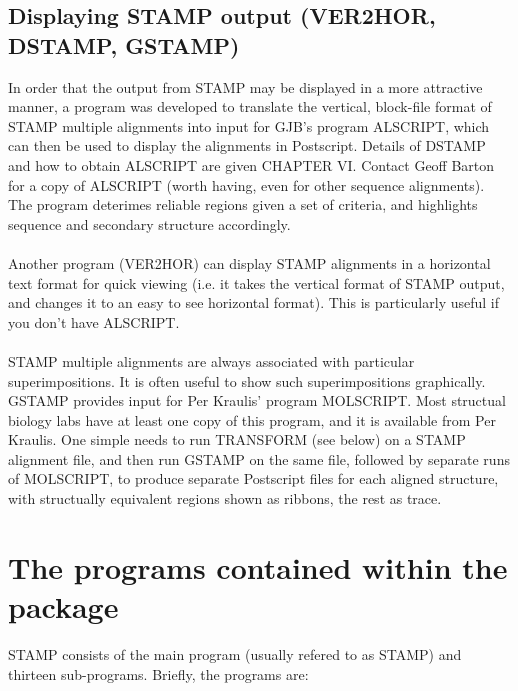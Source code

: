 \subsection{Displaying STAMP output (VER2HOR, DSTAMP, GSTAMP)}

In order that the output from STAMP may be displayed in a more 
attractive manner, a program was developed to translate the
vertical, block-file format of STAMP multiple alignments into input
for GJB's program ALSCRIPT, which can then be used to display the
alignments in Postscript.  Details of DSTAMP and how to obtain
ALSCRIPT are given CHAPTER VI.  Contact Geoff Barton for a copy of
ALSCRIPT (worth having, even for other sequence alignments).
The program deterimes reliable regions given a set of criteria, and
highlights sequence and secondary structure accordingly.\\
\\
Another program (VER2HOR) can display STAMP alignments in a horizontal text
format for quick viewing (i.e. it takes the vertical format of STAMP output, and
changes it to an easy to see horizontal format).
This is particularly useful if you don't have ALSCRIPT.\\
\\
STAMP multiple alignments are always associated with particular
superimpositions.  It is often useful to show such superimpositions
graphically.  GSTAMP provides input for Per
Kraulis' program MOLSCRIPT.  Most structual biology labs have at
least one copy of this program, and it is available from Per
Kraulis.  One simple needs to run TRANSFORM (see below) on a STAMP
alignment file, and then run GSTAMP on the same file, followed by
separate runs of MOLSCRIPT, to produce separate Postscript files
for each aligned structure, with structually equivalent regions
shown as ribbons, the rest as \Cal trace.

\section{The programs contained within the package}

STAMP consists of the main program (usually refered to as STAMP)
and thirteen  sub-programs.  Briefly, the programs are:\\


